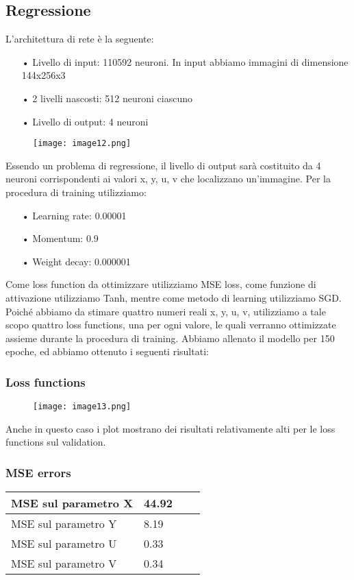 \subsection{Regressione}
L’architettura di rete è la seguente:
\begin{itemize}
	\item[•]Livello di input: 110592 neuroni. In input abbiamo immagini di dimensione 144x256x3
	\item[•]2 livelli nascosti: 512 neuroni ciascuno
	\item[•]Livello di output: 4 neuroni
\end{itemize}
\begin{figure}[H]
	\centering
	\texttt{[image: image12.png]}
\end{figure}
Essendo un problema di regressione, il livello di output sarà costituito da 4 neuroni corrispondenti ai valori x, y, u, v che localizzano un’immagine.
Per la procedura di training utilizziamo: 
\begin{itemize}
	\item[•]Learning rate: 0.00001
	\item[•]Momentum: 0.9
	\item[•]Weight decay: 0.000001
\end{itemize}
Come loss function da ottimizzare utilizziamo MSE loss, come funzione di attivazione utilizziamo Tanh, mentre come metodo di learning utilizziamo SGD.
Poiché abbiamo da stimare quattro numeri reali x, y, u, v, utilizziamo a tale scopo quattro loss functions, una per ogni valore, le quali verranno ottimizzate assieme durante la procedura di training.
Abbiamo allenato il modello per 150 epoche, ed abbiamo ottenuto i seguenti risultati:

\subsubsection{Loss functions}
\begin{figure}[H]
	\centering
	\texttt{[image: image13.png]}
\end{figure}
Anche in questo caso i plot mostrano dei risultati relativamente alti per le loss functions sul validation. 

\subsubsection{MSE errors}
\begin{center}
	\begin{tabular}{| l | l | l | l |}
		\hline
		MSE sul parametro X & 44.92 \\ \hline
		MSE sul parametro Y & 8.19 \\ \hline
		MSE sul parametro U & 0.33 \\ \hline
		MSE sul parametro V & 0.34 \\ \hline							
	\end{tabular}
\end{center}

